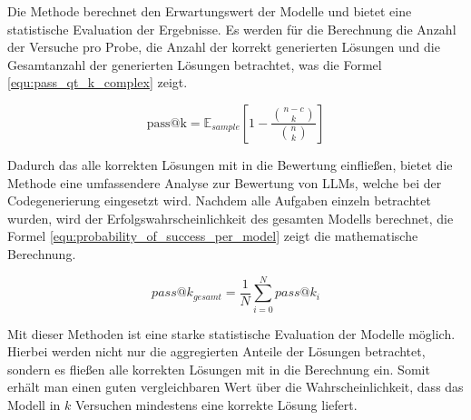 Die Methode berechnet den Erwartungswert der Modelle und bietet eine statistische Evaluation der Ergebnisse. Es werden für die Berechnung die Anzahl der Versuche pro Probe, die Anzahl der korrekt generierten Lösungen und die Gesamtanzahl der generierten Lösungen betrachtet, was die Formel \ref{equ:pass_qt_k_complex} zeigt.\vspace{0.2cm}

\begin{equation}\label{equ:pass_qt_k_complex}
	\text{pass@k} = \mathbb{E}_{sample} \left[ 1 - \frac{\binom{n-c}{k}}{\binom{n}{k}}\right]
\end{equation}

Dadurch das alle korrekten Lösungen mit in die Bewertung einfließen, bietet die Methode eine umfassendere Analyse zur Bewertung von LLMs, welche bei der Codegenerierung eingesetzt wird. Nachdem alle Aufgaben einzeln betrachtet wurden, wird der Erfolgswahrscheinlichkeit des gesamten Modells berechnet, die Formel \ref{equ:probability_of_success_per_model} zeigt die mathematische Berechnung.

\begin{equation}\label{equ:probability_of_success_per_model}
	pass@k_{gesamt} = \frac{1}{N} \sum_{i=0}^{N} pass@k_{i}
\end{equation}

Mit dieser Methoden ist eine starke statistische Evaluation der Modelle möglich. Hierbei werden nicht nur die aggregierten Anteile der Lösungen betrachtet, sondern es fließen alle korrekten Lösungen mit in die Berechnung ein. Somit erhält man einen guten vergleichbaren Wert über die Wahrscheinlichkeit, dass das Modell in $k$ Versuchen mindestens eine korrekte Lösung liefert.
